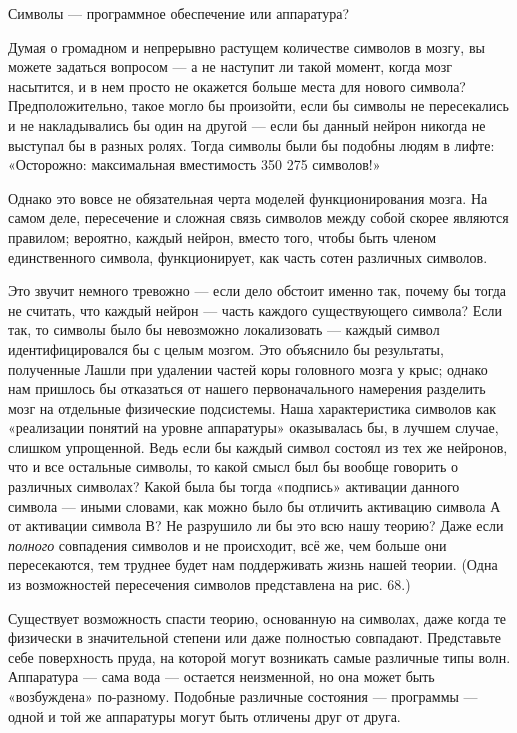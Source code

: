 \documentclass[../main.tex]{subfiles}
\begin{document}
Символы --- программное обеспечение или аппаратура?

Думая о громадном и непрерывно растущем количестве символов в мозгу, вы можете задаться вопросом --- а не наступит ли такой момент, когда мозг насытится, и в нем просто не окажется больше места для нового символа? Предположительно, такое могло бы произойти, если бы символы не пересекались и не накладывались бы один на другой --- если бы данный нейрон никогда не выступал бы в разных ролях. Тогда символы были бы подобны людям в лифте: «Осторожно: максимальная вместимость 350 275 символов!»

Однако это вовсе не обязательная черта моделей функционирования мозга. На самом деле, пересечение и сложная связь символов между собой скорее являются правилом; вероятно, каждый нейрон, вместо того, чтобы быть членом единственного символа, функционирует, как часть сотен различных символов.

Это звучит немного тревожно --- если дело обстоит именно так, почему бы тогда не считать, что каждый нейрон --- часть каждого существующего символа? Если так, то символы было бы невозможно локализовать --- каждый символ идентифицировался бы с целым мозгом. Это объяснило бы результаты, полученные Лашли при удалении частей коры головного мозга у крыс; однако нам пришлось бы отказаться от нашего первоначального намерения разделить мозг на отдельные физические подсистемы. Наша характеристика символов как «реализации понятий на уровне аппаратуры» оказывалась бы, в лучшем случае, слишком упрощенной. Ведь если бы каждый символ состоял из тех же нейронов, что и все остальные символы, то какой смысл был бы вообще говорить о различных символах? Какой была бы тогда «подпись» активации данного символа --- иными словами, как можно было бы отличить активацию символа А от активации символа В? Не разрушило ли бы это всю нашу теорию? Даже если \emph{полного} совпадения символов и не происходит, всё же, чем больше они пересекаются, тем труднее будет нам поддерживать жизнь нашей теории. (Одна из возможностей пересечения символов представлена на рис. 68.)

Существует возможность спасти теорию, основанную на символах, даже когда те физически в значительной степени или даже полностью совпадают. Представьте себе поверхность пруда, на которой могут возникать самые различные типы волн. Аппаратура --- сама вода --- остается неизменной, но она может быть «возбуждена» по-разному. Подобные различные состояния --- программы --- одной и той же аппаратуры могут быть отличены друг от друга.
\end{document}
